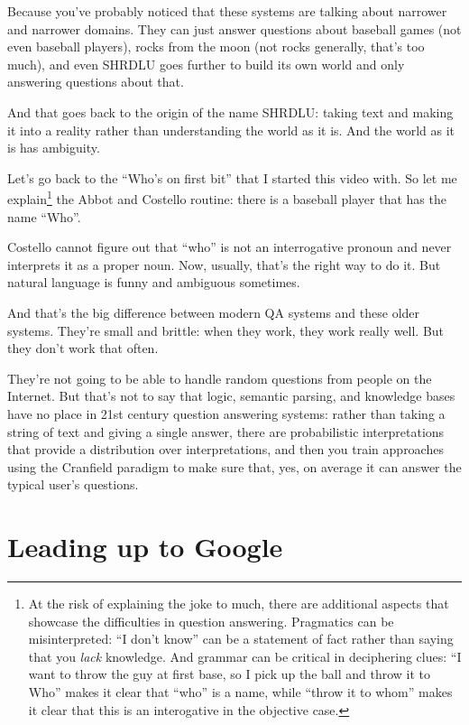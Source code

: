 Because you’ve probably noticed that these
systems are talking about narrower and narrower
%
domains.
%
They can just answer questions about baseball
games (not even baseball players), rocks from
%
the moon (not rocks generally, that’s too
much), and even SHRDLU goes further to build
%
its own world and only answering questions
about that.

And that goes back to the origin of the name
SHRDLU: taking text and making it into a reality
%
rather than understanding the world as it
is.
%
And the world as it is has ambiguity.

Let’s go back to the “Who’s on first
bit” that I started this video with.
%
So let me explain\footnote{At the risk of explaining the joke to much, there
are additional aspects that showcase the difficulties
in question answering.  
Pragmatics can be misinterpreted: ``I don't know'' can be a statement of fact
rather than saying that you \emph{lack} knowledge.  And grammar can be
critical in deciphering clues: ``I want to throw the guy at first base, so I
pick up the ball and throw it to Who'' makes it clear that ``who'' is a name,
while ``throw it to whom'' makes it clear that this is an interogative in the
objective case.} the Abbot and Costello routine:
there is a baseball player that has the name
%
``Who''.

Costello cannot figure out that “who”
is not an interrogative pronoun and never
%
interprets it as a proper noun.
%
Now, usually, that’s the right way to do
it.
%
But natural language is funny and ambiguous
sometimes.

And that’s the big difference between modern
QA systems and these older systems.
%
They’re small and brittle: when they work,
they work really well.
%
But they don’t work that often.

They’re not going to be able to handle random
questions from people on the Internet.
%
But that’s not to say that logic, semantic
parsing, and knowledge bases have no place
%
in 21st century question answering systems:
rather than taking a string of text and giving
%
a single answer, there are probabilistic interpretations
that provide a distribution over interpretations,
%
and then you train approaches using the Cranfield
paradigm to make sure that, yes, on average
%
it can answer the typical user’s questions.

\section{Leading up to Google}

